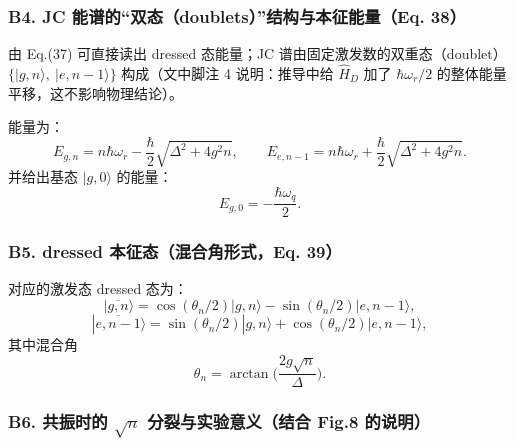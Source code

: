 \documentclass[12pt,a4paper,oneside]{ctexbook}
\begin{document}
\subsubsection{\texorpdfstring{\textbf{B4. JC
能谱的``双态（doublets）''结构与本征能量（Eq.
38）}}{B4. JC 能谱的``双态（doublets）''结构与本征能量（Eq. 38）}}\label{b4.-jc-ux80fdux8c31ux7684ux53ccux6001doubletsux7ed3ux6784ux4e0eux672cux5f81ux80fdux91cfeq.-38}

由 Eq.(37) 可直接读出 dressed 态能量；JC
谱由固定激发数的双重态（doublet） \(\{|g,n\rangle,\ |e,n-1\rangle\}\)
构成（文中脚注 4 说明：推导中给 \(\hat H_D\) 加了 \(\hbar\omega_r/2\)
的整体能量平移，这不影响物理结论）。

能量为： \[
E_{g,n}=n\hbar\omega_r-\frac{\hbar}{2}\sqrt{\Delta^2+4g^2n},
\qquad
E_{e,n-1}=n\hbar\omega_r+\frac{\hbar}{2}\sqrt{\Delta^2+4g^2n}.
\tag{38}
\] 并给出基态 \(|g,0\rangle\) 的能量： \[
E_{g,0}=-\frac{\hbar\omega_q}{2}.
\]

\subsubsection{\texorpdfstring{\textbf{B5. dressed 本征态（混合角形式，Eq.
39）}}{B5. dressed 本征态（混合角形式，Eq. 39）}}\label{b5.-dressed-ux672cux5f81ux6001ux6df7ux5408ux89d2ux5f62ux5f0feq.-39}

对应的激发态 dressed 态为： \[
|\overline{g,n}\rangle=\cos(\theta_n/2)|g,n\rangle-\sin(\theta_n/2)|e,n-1\rangle,
\] \[
|\overline{e,n-1}\rangle=\sin(\theta_n/2)|g,n\rangle+\cos(\theta_n/2)|e,n-1\rangle,
\tag{39}
\] 其中混合角 \[
\theta_n=\arctan\!\Big(\frac{2g\sqrt n}{\Delta}\Big).
\]

\subsubsection{\texorpdfstring{\textbf{B6. 共振时的 \(\sqrt n\)
分裂与实验意义（结合 Fig.8
的说明）}}{B6. 共振时的 \textbackslash{}sqrt n 分裂与实验意义（结合 Fig.8 的说明）}}\label{b6.-ux5171ux632fux65f6ux7684-sqrt-n-ux5206ux88c2ux4e0eux5b9eux9a8cux610fux4e49ux7ed3ux5408-fig.8-ux7684ux8bf4ux660e}
\end{document}
